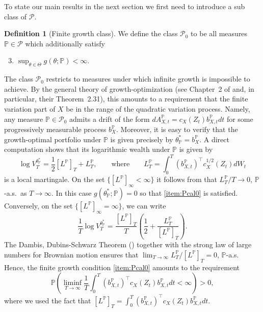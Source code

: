 \documentclass{article}
\theoremstyle{plain}
\theoremstyle{definition}
\newtheorem{defn}[lem]{Definition}
\newcommand{\R}{\mathbb{R}}
\renewcommand{\P}{\mathbb{P}}
\newcommand{\Pcal}{{\mathcal P}}
\numberwithin{lem}{section}
\begin{document}
To state our main results in the next section we first need to introduce a sub class of $\Pcal$. 
\begin{defn}[Finite growth class] \label{defn:P0}
    We define the class $\Pcal_0$ to be all measures $\P \in \Pcal$ which additionally satisfy
    \begin{enumerate}
    \setcounter{enumi}{2}
        \item  $\sup_{\theta \in \Theta}g(\theta;\P) < \infty.$ \label{item:Pcal0}
    \end{enumerate}
\end{defn}
The class $\Pcal_0$ restricts to measures under which infinite growth is impossible to achieve. By the general theory of growth-optimization (see Chapter~2 of \cite{karatzas2021portfolio} and, in particular, their Theorem~2.31), this amounts to a requirement that the finite variation part of $X$ be in the range of the quadratic variation process. Namely, any measure $\P \in \Pcal_0$ admits a drift of the form $dA^\P_{X,t} = c_X(Z_t)b^\P_{X,t}dt$ for some progressively measurable process $b^\P_X$. Moreover, it is easy to verify that the growth-optimal portfolio under $\P$ is given precisely by $ \theta^*_\P = b^\P_X$. A direct computation shows that its logarithmic wealth under $\P$ is given by
\[\log V^{\theta^*_\P}_T = \frac{1}{2}[L^\P]_T + L^\P_T,\qquad \text{where} \qquad L^\P_T = \int_0^T (b^\P_{X,t})^\top c_X^{1/2}(Z_t)dW_t\] is a local martingale. On the set $\{[L^\P]_\infty < \infty\}$ it follows from \cite[Lemma~1.3.2]{fernholz2002stochastic} that $L^\P_T/T \to 0$, $\P$-a.s.\ as $T \to \infty$. In this case $g( \theta^*_\P;\P) = 0$ so that \ref{item:Pcal0} is satisfied. Conversely, on the set $\{[L^\P]_\infty = \infty \}$, we can write
\[\frac{1}{T}\log V_T^{ \theta^*_\P} = \frac{[L^\P]_T}{T}\left(\frac{1}{2} + \frac{L^\P_T}{[L^\P]_T}\right).\] The Dambis, Dubins-Schwarz Theorem (\cite[Theorem~V.1.6]{revuz1999continuous}) together with the strong law of large numbers for Brownian motion ensures that $\lim_{T \to \infty} L_T^\P/[L^\P]_T = 0$, $\P$-a.s. Hence, the finite growth condition \ref{item:Pcal0} amounts to the requirement
\begin{equation} \label{eqn:bP_condition}
    \P\left(\liminf_{T \to \infty} \frac{1}{T}\int_0^T (b^\P_{X,t})^\top c_X(Z_t)b^\P_{X,t}dt < \infty\right) > 0,
\end{equation}
where we used the fact that $[L^\P]_T = \int_0^T (b^\P_{X,t})^\top c_X(Z_t)b^\P_{X,t}dt$.
\end{document}
